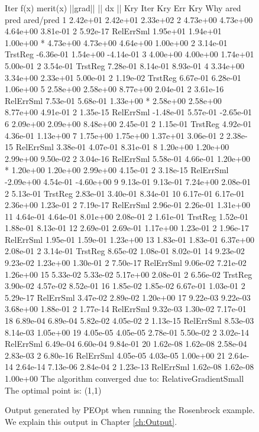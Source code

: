\documentclass{report}
\begin{document}
\begin{figure}
\begin{sideways}
\begin{lstPeopt}
Iter      f(x)      merit(x)  ||grad||  || dx ||  Kry Iter  Kry Err   Kry Why   ared      pred      ared/pred 
1         2.42e+01  2.42e+01  2.33e+02                                                                        
2         4.73e+00  4.73e+00  4.64e+00  3.81e-01  2         5.92e-17  RelErrSml 1.95e+01  1.94e+01  1.00e+00  
*         4.73e+00  4.73e+00  4.64e+00  1.00e+00  2         3.14e-01  TrstReg   -6.36e-01 1.54e+00  -4.14e-01 
3         4.00e+00  4.00e+00  1.74e+01  5.00e-01  2         3.54e-01  TrstReg   7.28e-01  8.14e-01  8.93e-01  
4         3.34e+00  3.34e+00  2.33e+01  5.00e-01  2         1.19e-02  TrstReg   6.67e-01  6.28e-01  1.06e+00  
5         2.58e+00  2.58e+00  8.77e+00  2.04e-01  2         3.61e-16  RelErrSml 7.53e-01  5.68e-01  1.33e+00  
*         2.58e+00  2.58e+00  8.77e+00  4.91e-01  2         1.35e-15  RelErrSml -1.48e-01 5.57e-01  -2.65e-01 
6         2.09e+00  2.09e+00  8.48e+00  2.45e-01  2         1.15e-01  TrstReg   4.92e-01  4.36e-01  1.13e+00  
7         1.75e+00  1.75e+00  1.37e+01  3.06e-01  2         2.38e-15  RelErrSml 3.38e-01  4.07e-01  8.31e-01  
8         1.20e+00  1.20e+00  2.99e+00  9.50e-02  2         3.04e-16  RelErrSml 5.58e-01  4.66e-01  1.20e+00  
*         1.20e+00  1.20e+00  2.99e+00  4.15e-01  2         3.18e-15  RelErrSml -2.09e+00 4.54e-01  -4.60e+00 
9         9.13e-01  9.13e-01  7.24e+00  2.08e-01  2         5.13e-01  TrstReg   2.83e-01  3.40e-01  8.34e-01  
10        6.17e-01  6.17e-01  2.36e+00  1.23e-01  2         7.19e-17  RelErrSml 2.96e-01  2.26e-01  1.31e+00  
11        4.64e-01  4.64e-01  8.01e+00  2.08e-01  2         1.61e-01  TrstReg   1.52e-01  1.88e-01  8.13e-01  
12        2.69e-01  2.69e-01  1.17e+00  1.23e-01  2         1.96e-17  RelErrSml 1.95e-01  1.59e-01  1.23e+00  
13        1.83e-01  1.83e-01  6.37e+00  2.08e-01  2         3.14e-01  TrstReg   8.65e-02  1.08e-01  8.02e-01  
14        9.23e-02  9.23e-02  1.23e+00  1.30e-01  2         7.50e-17  RelErrSml 9.06e-02  7.21e-02  1.26e+00  
15        5.33e-02  5.33e-02  5.17e+00  2.08e-01  2         6.56e-02  TrstReg   3.90e-02  4.57e-02  8.52e-01  
16        1.85e-02  1.85e-02  6.67e-01  1.03e-01  2         5.29e-17  RelErrSml 3.47e-02  2.89e-02  1.20e+00  
17        9.22e-03  9.22e-03  3.68e+00  1.88e-01  2         1.77e-14  RelErrSml 9.32e-03  1.30e-02  7.17e-01  
18        6.89e-04  6.89e-04  5.82e-02  4.05e-02  2         1.13e-15  RelErrSml 8.53e-03  8.14e-03  1.05e+00  
19        4.05e-05  4.05e-05  2.78e-01  5.50e-02  2         3.02e-14  RelErrSml 6.49e-04  6.60e-04  9.84e-01  
20        1.62e-08  1.62e-08  2.58e-04  2.83e-03  2         6.80e-16  RelErrSml 4.05e-05  4.03e-05  1.00e+00  
21        2.64e-14  2.64e-14  7.13e-06  2.84e-04  2         1.23e-13  RelErrSml 1.62e-08  1.62e-08  1.00e+00  
The algorithm converged due to: RelativeGradientSmall
The optimal point is: (1,1)
\end{lstPeopt}
\end{sideways}
\caption{Output generated by PEOpt when running the Rosenbrock example.  We explain this output in Chapter \ref{ch:Output}.}
\label{fig:RosenOut}
\end{figure}
\end{document}
